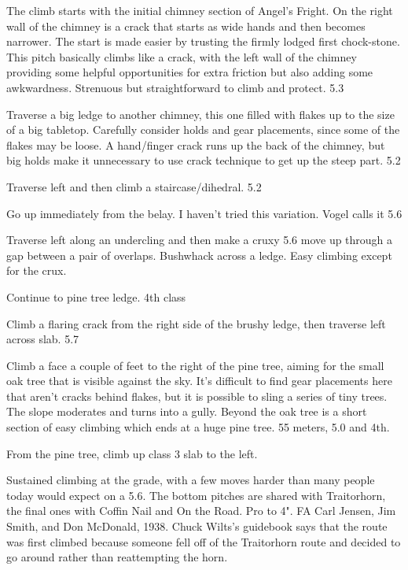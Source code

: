 \documentclass{tahquitz}
\begin{document}
 The climb starts with the initial chimney section of Angel's Fright.
On the right wall of the chimney is a crack that
starts as wide hands and then becomes narrower.  The start is made
easier by trusting the firmly lodged first chock-stone.  This pitch
basically climbs like a crack, with the left wall of the chimney
providing some helpful opportunities for extra friction but also
adding some awkwardness.  Strenuous but straightforward to climb and
protect.
5.3

 Traverse a big ledge to another chimney, this one filled with
flakes up to the size of a big tabletop. Carefully consider holds and
gear placements, since some of the flakes may be loose. A hand/finger crack
runs up the back of the chimney, but big holds make it unnecessary to use crack
technique to get up the steep part. 5.2

 Traverse left and then climb a staircase/dihedral. 5.2

 Go up immediately from the belay. I haven't tried this
variation. Vogel calls it 5.6

 Traverse left along an undercling and then make a cruxy 5.6 move
up through a gap between a pair of overlaps. Bushwhack across a
ledge. Easy climbing except for the crux.

 Continue to pine tree ledge. 4th class

 Climb a flaring crack from the right side of the brushy ledge,
then traverse left across slab. 5.7

 Climb a face a couple of feet to the right of the pine tree,
aiming for the small oak tree that is visible against the sky. It's
difficult to find gear placements here that aren't cracks behind
flakes, but it is possible to sling a series of tiny trees. The slope
moderates and turns into a gully. Beyond the oak tree is a short
section of easy climbing which ends at a huge pine tree. 55 meters,
5.0 and 4th.

From the pine tree, climb up class 3 slab to the left.

\somespace

\upfriction



Sustained climbing at the grade, with a few moves harder than many
people today would expect on a 5.6. The bottom pitches are shared with
Traitorhorn, the final ones with Coffin Nail and On the Road.  Pro
to 4".  FA Carl Jensen, Jim Smith, and Don McDonald, 1938. Chuck
Wilts's guidebook says that the route was first climbed because
someone fell off of the Traitorhorn route and decided to go around
rather than reattempting the horn. 
\end{document}
